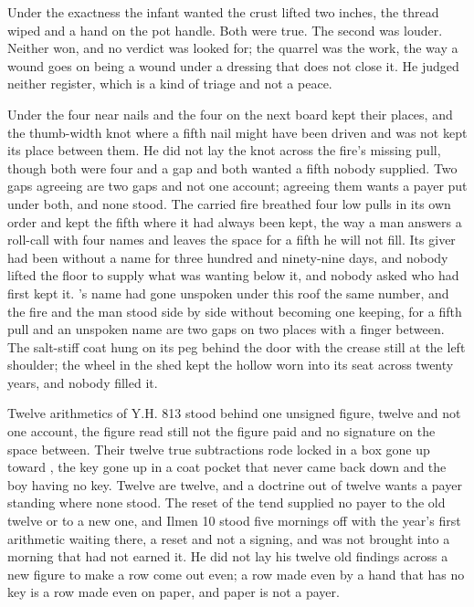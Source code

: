 Under the exactness the infant wanted the crust lifted two inches, the thread wiped and a hand on the pot handle. Both were true. The second was louder. Neither won, and no verdict was looked for; the quarrel was the work, the way a wound goes on being a wound under a dressing that does not close it. He judged neither register, which is a kind of triage and not a peace.

Under  the four near nails and the four on the next board kept their places, and the thumb-width knot where a fifth nail might have been driven and was not kept its place between them. He did not lay the knot across the fire's missing pull, though both were four and a gap and both wanted a fifth nobody supplied. Two gaps agreeing are two gaps and not one account; agreeing them wants a payer put under both, and none stood. The carried fire breathed four low pulls in its own order and kept the fifth where it had always been kept, the way a man answers a roll-call with four names and leaves the space for a fifth he will not fill. Its giver had been without a name for three hundred and ninety-nine days, and nobody lifted the floor to supply what was wanting below it, and nobody asked who had first kept it. 's name had gone unspoken under this roof the same number, and the fire and the man stood side by side without becoming one keeping, for a fifth pull and an unspoken name are two gaps on two places with a finger between. The salt-stiff coat hung on its peg behind the door with the crease still at the left shoulder; the wheel in the shed kept the hollow worn into its seat across twenty years, and nobody filled it.

Twelve arithmetics of Y.H. 813 stood behind one unsigned figure, twelve and not one account, the figure read still not the figure paid and no signature on the space between. Their twelve true subtractions rode locked in a box gone up  toward , the key gone up in a coat pocket that never came back down and the boy having no key. Twelve are twelve, and a doctrine out of twelve wants a payer standing where none stood. The reset of the tend supplied no payer to the old twelve or to a new one, and Ilmen 10 stood five mornings off with the year's first arithmetic waiting there, a reset and not a signing, and was not brought into a morning that had not earned it. He did not lay his twelve old findings across a new figure to make a row come out even; a row made even by a hand that has no key is a row made even on paper, and paper is not a payer.

